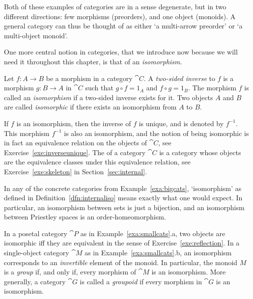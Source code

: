 Both of these examples of categories are in a sense degenerate, but in two different directions: few morphisms (preorders), and one object (monoids). A general category can thus be thought of as either `a multi-arrow preorder' or `a multi-object monoid'.

\medskip

One more central notion in categories, that we introduce now because we will need it throughout this chapter, is that of an \emph{isomorphism}.

\begin{definition}\label{dfn:internaliso}
Let $f \colon A \to B$ be a morphism in a category $\cat{C}$. A \emph{two-sided inverse} to $f$ is a morphism $g \colon B \to A$ in $\cat{C}$ such that $g \circ f = 1_A$ and $f \circ g = 1_B$. The morphism $f$ is called an \emph{isomorphism} if a two-sided inverse exists for it. Two objects $A$ and $B$ are called \emph{isomorphic} if there exists an isomorphism from $A$ to $B$.
\end{definition}
If $f$ is an isomorphism, then the inverse of $f$ is unique, and is denoted by $f^{-1}$. This morphism $f^{-1}$ is also an isomorphism, and the notion of being isomorphic is in fact an equivalence relation on the objects of $\cat{C}$, see Exercise~\ref{exe:inverseunique}. The  of a category $\cat{C}$ is a category whose objects are the equivalence classes under this equivalence relation, see Exercise~\ref{exe:skeleton} in Section~\ref{sec:internal}.


\begin{example}
In any of the concrete categories from Example~\ref{exa:bigcats}, `isomorphism' as defined in Definition~\ref{dfn:internaliso} means exactly what one would expect. In particular, an isomorphism between sets is just a bijection, and an isomorphism between Priestley spaces is an order-homeomorphism.

In a posetal category $\cat{P}$ as in Example~\ref{exa:smallcats}.a, two objects are isomorphic iff they are equivalent in the sense of Exercise~\ref{exe:reflection}. In a single-object category $\cat{M}$ as in Example~\ref{exa:smallcats}.b, an isomorphism corresponds to an \emph{invertible} element of the monoid. In particular, the monoid $M$ is a \emph{group} if, and only if, every morphism of $\cat{M}$ is an isomorphism. More generally, a category $\cat{G}$ is called a \emph{groupoid} if every morphism in $\cat{G}$ is an isomorphism.
\end{example}


